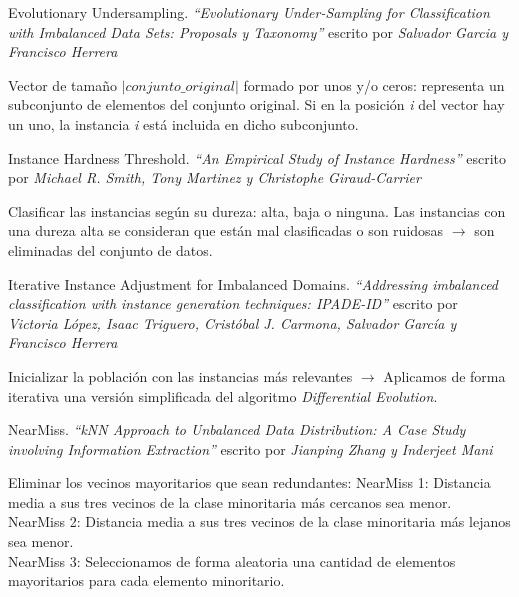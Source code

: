 \documentclass[10pt]{beamer}
\begin{document}
\begin{frame}[fragile]{Evolutionary Undersampling.}
\textit{``Evolutionary Under-Sampling for Classification with Imbalanced Data Sets: Proposals y Taxonomy''} escrito por \textit{Salvador Garcia y Francisco Herrera} \cite{eus} \\
\bigskip
\bigskip

Vector de tamaño $\left | conjunto\_original \right |$ formado por unos y/o ceros: representa un subconjunto de elementos del conjunto original. Si en la posición \textit{i} del vector hay un uno, la instancia \textit{i} está incluida en dicho subconjunto.
\end{frame}

\begin{frame}[fragile]{Instance Hardness Threshold.}
\textit{``An Empirical Study of Instance Hardness''} escrito por \textit{Michael R. Smith, Tony Martinez y Christophe Giraud-Carrier} \cite{ihts} \\
\bigskip
\bigskip

Clasificar las instancias según su dureza: alta, baja o ninguna. Las instancias con una dureza alta se consideran que están mal clasificadas o son ruidosas $\rightarrow$ son eliminadas del conjunto de datos.
\end{frame}

\begin{frame}[fragile]{Iterative Instance Adjustment for Imbalanced Domains.}
\textit{``Addressing imbalanced classification with instance generation techniques: IPADE-ID''} escrito por \textit{Victoria López, Isaac Triguero, Cristóbal J. Carmona, Salvador García y Francisco Herrera} \cite{ipade} \\
\bigskip
\bigskip

Inicializar la población con las instancias más relevantes $\rightarrow$ Aplicamos de forma iterativa una versión simplificada del algoritmo \textit{Differential Evolution}.
\end{frame}

\begin{frame}[fragile]{NearMiss.}
\textit{``kNN Approach to Unbalanced Data Distribution: A Case Study involving Information Extraction''} escrito por \textit{Jianping Zhang y Inderjeet Mani} \cite{nm} \\
\bigskip
\bigskip

Eliminar los vecinos mayoritarios que sean redundantes:
\newline
\newline
NearMiss 1: Distancia media a sus tres vecinos de la clase minoritaria más cercanos sea menor. \\
NearMiss 2: Distancia media a sus tres vecinos de la clase minoritaria más lejanos sea menor. \\
NearMiss 3: Seleccionamos de forma aleatoria una cantidad de elementos mayoritarios para cada elemento minoritario.
\end{frame}
\end{document}

